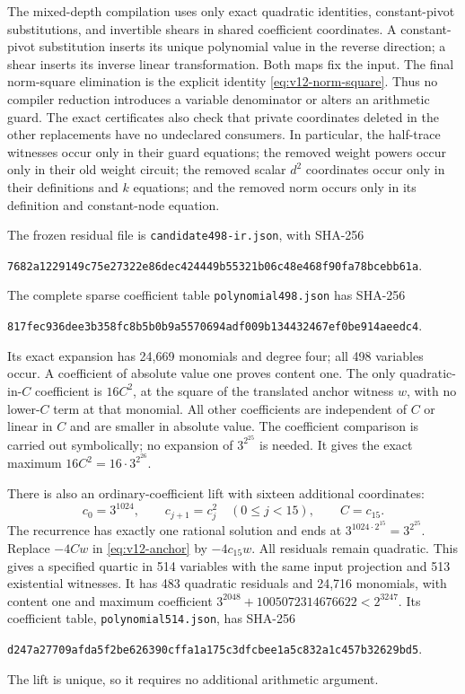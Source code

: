 The mixed-depth compilation uses only exact quadratic identities,
constant-pivot substitutions, and invertible shears in shared
coefficient coordinates.  A constant-pivot substitution inserts its
unique polynomial value in the reverse direction; a shear inserts
its inverse linear transformation.  Both maps fix the input.
The final norm-square elimination is the explicit identity
\eqref{eq:v12-norm-square}.  Thus no compiler reduction introduces a
variable denominator or alters an arithmetic guard.  The exact
certificates also check that private coordinates deleted in the
other replacements have no undeclared consumers.  In particular,
the half-trace witnesses occur only in their guard equations; the
removed weight powers occur only in their old weight circuit; the
removed scalar $d^2$ coordinates occur only in their definitions and
$k$ equations; and the removed norm occurs only in its definition and
constant-node equation.

The frozen residual file is \texttt{candidate498-ir.json}, with
SHA-256
\begin{center}\small
\nolinkurl{7682a1229149c75e27322e86dec424449b55321b06c48e468f90fa78bcebb61a}.
\end{center}
The complete sparse coefficient table \texttt{polynomial498.json}
has SHA-256
\begin{center}\small
\nolinkurl{817fec936dee3b358fc8b5b0b9a5570694adf009b134432467ef0be914aeedc4}.
\end{center}
Its exact expansion has 24,669 monomials and degree four; all 498
variables occur.  A coefficient of absolute value one proves content
one.  The only quadratic-in-$C$ coefficient is $16C^2$, at the square
of the translated anchor witness $w$, with no lower-$C$ term at that
monomial.  All other coefficients are independent of $C$ or linear
in $C$ and are smaller in absolute value.  The coefficient comparison
is carried out symbolically; no expansion of $3^{2^{25}}$ is needed.
It gives the exact maximum $16C^2=16\cdot3^{2^{26}}$.

There is also an ordinary-coefficient lift with sixteen additional
coordinates:
\[
 c_0=3^{1024},\qquad c_{j+1}=c_j^2\quad(0\le j<15),\qquad C=c_{15}.
\]
The recurrence has exactly one rational solution and ends at
$3^{1024\cdot2^{15}}=3^{2^{25}}$.  Replace $-4Cw$ in
\eqref{eq:v12-anchor} by $-4c_{15}w$.  All residuals remain quadratic.
This gives a specified quartic in 514 variables with the same input
projection and 513 existential witnesses.  It has 483 quadratic
residuals and 24,716 monomials, with content one and maximum coefficient
$3^{2048}+1005072314676622<2^{3247}$.  Its coefficient table,
\texttt{polynomial514.json}, has SHA-256
\begin{center}\small
\nolinkurl{d247a27709afda5f2be626390cffa1a175c3dfcbee1a5c832a1c457b32629bd5}.
\end{center}
The lift is unique, so it requires no additional arithmetic argument.

